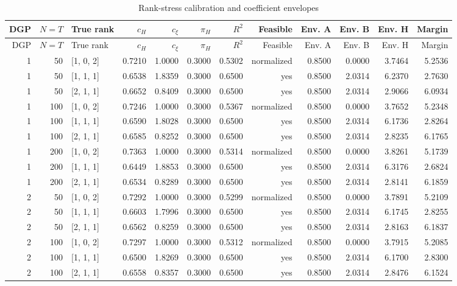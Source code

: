 \begingroup
\small
\begin{longtable}{rrlrrrrrrrrr}
\caption{Rank-stress calibration and coefficient envelopes}\label{tab:mc-rank-stress-calibration}\\
\toprule
DGP & $N=T$ & True rank & $c_H$ & $c_\xi$ & $\pi_H$ & $R^2$ & Feasible & Env. A & Env. B & Env. H & Margin \\
\midrule
\endfirsthead
\toprule
DGP & $N=T$ & True rank & $c_H$ & $c_\xi$ & $\pi_H$ & $R^2$ & Feasible & Env. A & Env. B & Env. H & Margin \\
\midrule
\endhead
1 & 50 & [1, 0, 2] & 0.7210 & 1.0000 & 0.3000 & 0.5302 & normalized & 0.8500 & 0.0000 & 3.7464 & 5.2536 \\
1 & 50 & [1, 1, 1] & 0.6538 & 1.8359 & 0.3000 & 0.6500 & yes & 0.8500 & 2.0314 & 6.2370 & 2.7630 \\
1 & 50 & [2, 1, 1] & 0.6652 & 0.8409 & 0.3000 & 0.6500 & yes & 0.8500 & 2.0314 & 2.9066 & 6.0934 \\
1 & 100 & [1, 0, 2] & 0.7246 & 1.0000 & 0.3000 & 0.5367 & normalized & 0.8500 & 0.0000 & 3.7652 & 5.2348 \\
1 & 100 & [1, 1, 1] & 0.6590 & 1.8028 & 0.3000 & 0.6500 & yes & 0.8500 & 2.0314 & 6.1736 & 2.8264 \\
1 & 100 & [2, 1, 1] & 0.6585 & 0.8252 & 0.3000 & 0.6500 & yes & 0.8500 & 2.0314 & 2.8235 & 6.1765 \\
1 & 200 & [1, 0, 2] & 0.7363 & 1.0000 & 0.3000 & 0.5314 & normalized & 0.8500 & 0.0000 & 3.8261 & 5.1739 \\
1 & 200 & [1, 1, 1] & 0.6449 & 1.8853 & 0.3000 & 0.6500 & yes & 0.8500 & 2.0314 & 6.3176 & 2.6824 \\
1 & 200 & [2, 1, 1] & 0.6534 & 0.8289 & 0.3000 & 0.6500 & yes & 0.8500 & 2.0314 & 2.8141 & 6.1859 \\
2 & 50 & [1, 0, 2] & 0.7292 & 1.0000 & 0.3000 & 0.5299 & normalized & 0.8500 & 0.0000 & 3.7891 & 5.2109 \\
2 & 50 & [1, 1, 1] & 0.6603 & 1.7996 & 0.3000 & 0.6500 & yes & 0.8500 & 2.0314 & 6.1745 & 2.8255 \\
2 & 50 & [2, 1, 1] & 0.6562 & 0.8259 & 0.3000 & 0.6500 & yes & 0.8500 & 2.0314 & 2.8163 & 6.1837 \\
2 & 100 & [1, 0, 2] & 0.7297 & 1.0000 & 0.3000 & 0.5312 & normalized & 0.8500 & 0.0000 & 3.7915 & 5.2085 \\
2 & 100 & [1, 1, 1] & 0.6500 & 1.8269 & 0.3000 & 0.6500 & yes & 0.8500 & 2.0314 & 6.1700 & 2.8300 \\
2 & 100 & [2, 1, 1] & 0.6558 & 0.8357 & 0.3000 & 0.6500 & yes & 0.8500 & 2.0314 & 2.8476 & 6.1524 \\

\end{longtable}
